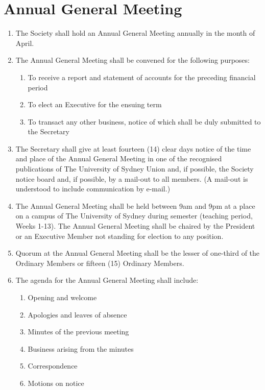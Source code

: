 \documentclass[11pt]{article}
\begin{document}
\section{Annual General Meeting}
\begin{enumerate}[\thesection .1]
    \item The Society shall hold an Annual General Meeting annually in the month of April.
    \item The Annual General Meeting shall be convened for the following purposes:
    \begin{enumerate}[\hspace{5mm}i.]
        \item To receive a report and statement of accounts for the preceding financial period
        \item To elect an Executive for the ensuing term
        \item To transact any other business, notice of which shall be duly submitted to the Secretary
    \end{enumerate}
    \item The Secretary shall give at least fourteen (14) clear days notice of the time and place of the Annual General Meeting in one of the recognised publications of The University of Sydney Union and, if possible, the Society notice board and, if possible, by a mail-out to all members. (A mail-out is understood to include communication by e-mail.)
    \item The Annual General Meeting shall be held between 9am and 9pm at a place on a campus of The University of Sydney during semester (teaching period, Weeks 1-13). The Annual General Meeting shall be chaired by the President or an Executive Member not standing for election to any position.
    \item Quorum at the Annual General Meeting shall be the lesser of one-third of the Ordinary Members or fifteen (15) Ordinary Members.
    \item The agenda for the Annual General Meeting shall include:
    \begin{enumerate}[\hspace{5mm}1.]
        \item Opening and welcome
    	\item Apologies and leaves of absence
    	\item Minutes of the previous meeting
    	\item Business arising from the minutes
    	\item Correspondence
    	\item Motions on notice

\end{enumerate}
\end{enumerate}
\end{document}
